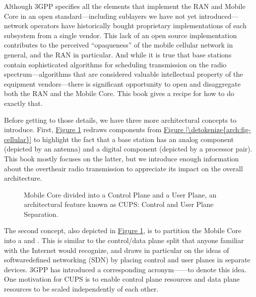 \documentclass[a4paper,11pt,english]{sphinxmanual}
\let\sphinxpxdimen\pdfpxdimen\else\newdimen\sphinxpxdimen
\begin{document}
\sphinxAtStartPar
Although 3GPP specifies all the elements that implement the RAN and
Mobile Core in an open standard—including sub\sphinxhyphen{}layers we have not yet
introduced—network operators have historically bought proprietary
implementations of each subsystem from a single vendor. This lack of
an open source implementation contributes to the perceived
“opaqueness” of the mobile cellular network in general, and the RAN in
particular. And while it is true that base stations contain
sophisticated algorithms for scheduling transmission on the radio
spectrum—algorithms that are considered valuable intellectual property
of the equipment vendors—there is significant opportunity to open and
disaggregate both the RAN and the Mobile Core. This book gives a
recipe for how to do exactly that.

\sphinxAtStartPar
Before getting to those details, we have three more architectural
concepts to introduce. First, \hyperref[\detokenize{arch:fig-cups}]{Figure \ref{\detokenize{arch:fig-cups}}} redraws
components from \hyperref[\detokenize{arch:fig-cellular}]{Figure \ref{\detokenize{arch:fig-cellular}}} to highlight the
fact that a base station has an analog component (depicted by an
antenna) and a digital component (depicted by a processor pair). This
book mostly focuses on the latter, but we introduce enough information
about the over\sphinxhyphen{}the\sphinxhyphen{}air radio transmission to appreciate its impact on
the overall architecture.

\begin{figure}[ht]
\centering
\capstart

\noindent\sphinxincludegraphics[width=400\sphinxpxdimen]{{Slide3}.png}
\caption{Mobile Core divided into a Control Plane and a User Plane, an
architectural feature known as CUPS: Control and User Plane
Separation.}\label{\detokenize{arch:id4}}\label{\detokenize{arch:fig-cups}}\end{figure}

\sphinxAtStartPar
The second concept, also depicted in \hyperref[\detokenize{arch:fig-cups}]{Figure \ref{\detokenize{arch:fig-cups}}},
is to partition the Mobile Core into a  and . This is similar to the control/data plane split that anyone
familiar with the Internet would recognize, and draws in particular on
the ideas of software\sphinxhyphen{}defined networking (SDN) by placing control and
user planes in separate devices. 3GPP has introduced a corresponding
acronym——to denote this
idea. One motivation for CUPS is to enable control plane resources and
data plane resources to be scaled independently of each other.
\end{document}
